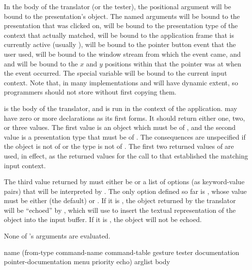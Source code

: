 In the body of the translator (or the tester), the positional 
argument will be bound to the presentation's object.  The named arguments
 will be bound to the presentation that was clicked on,
 will be bound to the presentation type of the context that
actually matched,  will be bound to the application frame that is
currently active (usually ),  will be bound
to the pointer button event that the user used,  will be bound to
the window stream from which the event came, and  and  will be
bound to the $x$ and $y$ positions within  that the pointer was at
when the event occurred.  The special variable  will be
bound to the current input context.  Note that, in many implementations
 and  will have dynamic extent, so
programmers should not store without first copying them.

 is the body of the translator, and is run in the context of the
application.   may have zero or more declarations as its first forms.
It should return either one, two, or three values.  The first value is an object
which must be  of , and the second value is
a presentation type that must be  of .
The consequences are unspecified if the object is not  of
 or the type is not  of .
The first two returned values of  are used, in effect, as the returned
values for the call to  that established the matching input context.

The third value returned by  must either be  or a list of
options (as keyword-value pairs) that will be interpreted by .  The
only option defined so far is , whose value must be either 
(the default) or .  If it is , the object returned by the
translator will be ``echoed'' by , which will use
 to insert the textual representation of the
object into the input buffer.  If it is , the object will not be
echoed.

None of 's arguments are evaluated.


 {name 
                                                       (from-type command-name command-table
                                                        \key gesture tester
                                                             documentation pointer-documentation 
                                                             menu priority echo)
                                                       arglist
                                                       \body body}

